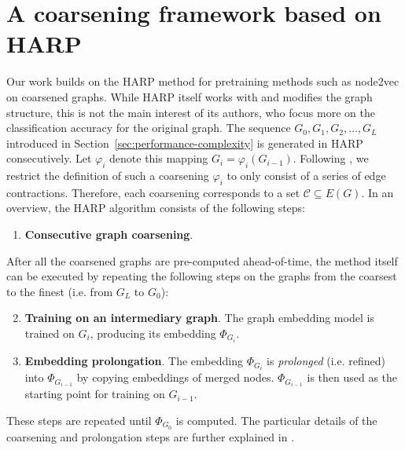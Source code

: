 \section{A coarsening framework based on HARP}\label{sec:harp}

Our work builds on the HARP method \cite{chen_harp_2018} for pretraining methods such as node2vec \cite{grover_node2vec_2016} on coarsened graphs. While HARP itself works with and modifies the graph structure, this is not the main interest of its authors, who focus more on the classification accuracy for the original graph. The sequence \( G_0, G_1, G_2, \dots, G_L \) introduced in Section~\ref{sec:performance-complexity} is generated in HARP consecutively. Let \( \varphi_i \) denote this mapping \( G_i = \varphi_i \left( G_{i - 1} \right) \). Following \cite{schulz_mining_2019}, we restrict the definition of such a coarsening \( \varphi_i \) to only consist of a series of edge contractions. Therefore, each coarsening corresponds to a set \( \mathcal{C} \subseteq E \left( G \right) \). In an overview, the HARP algorithm consists of the following steps:

\begin{enumerate}
  \item \textbf{Consecutive graph coarsening}.
\end{enumerate}
After all the coarsened graphs are pre-computed ahead-of-time, the method itself can be executed by repeating the following steps on the graphs from the coarsest to the finest (i.e. from \( G_L \) to \( G_0 \)):
\begin{enumerate}\setcounter{enumi}{1}
  \item \textbf{Training on an intermediary graph}. The graph embedding model is trained on \( G_i \), producing its embedding \( \Phi_{G_i} \).
  \item \textbf{Embedding prolongation}. The embedding \( \Phi_{G_i} \) is \textit{prolonged} (i.e. refined) into \( \Phi_{G_{i - 1}} \) by copying embeddings of merged nodes. \( \Phi_{G_{i - 1}} \) is then used as the starting point for training on \( G_{i - 1} \).
\end{enumerate}
These steps are repeated until \( \Phi_{G_0} \) is computed. The particular details of the coarsening and prolongation steps are further explained in \cite{chen_harp_2018}.
